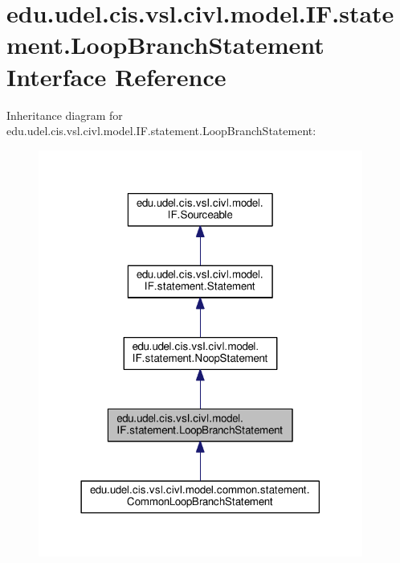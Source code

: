 \hypertarget{interfaceedu_1_1udel_1_1cis_1_1vsl_1_1civl_1_1model_1_1IF_1_1statement_1_1LoopBranchStatement}{}\section{edu.\+udel.\+cis.\+vsl.\+civl.\+model.\+I\+F.\+statement.\+Loop\+Branch\+Statement Interface Reference}
\label{interfaceedu_1_1udel_1_1cis_1_1vsl_1_1civl_1_1model_1_1IF_1_1statement_1_1LoopBranchStatement}


Inheritance diagram for edu.\+udel.\+cis.\+vsl.\+civl.\+model.\+I\+F.\+statement.\+Loop\+Branch\+Statement\+:
\nopagebreak
\begin{figure}[H]
\begin{center}
\leavevmode
\includegraphics[width=302pt]{interfaceedu_1_1udel_1_1cis_1_1vsl_1_1civl_1_1model_1_1IF_1_1statement_1_1LoopBranchStatement__inherit__graph}
\end{center}
\end{figure}


